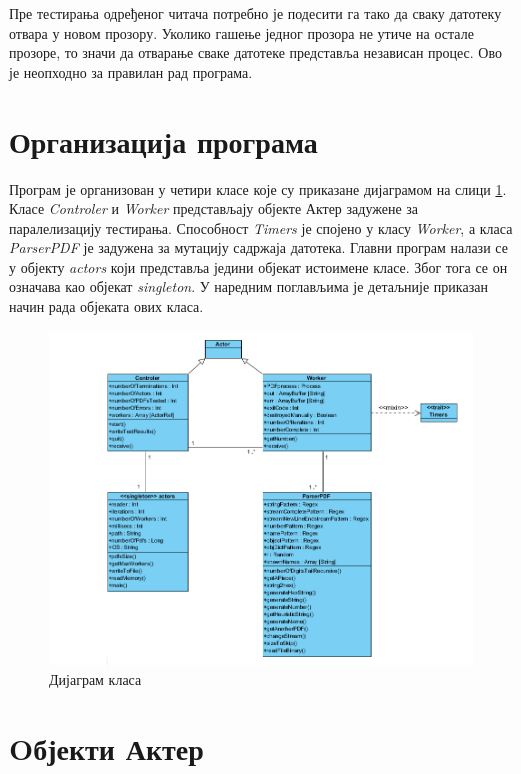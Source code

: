 \documentclass[12pt,oneside]{memoir}
\begin{document}
Пре тестирања одређеног читача потребно је подесити га тако да сваку датотеку отвара у новом прозору. Уколико гашење једног прозора не утиче на остале прозоре, то значи да отварање сваке датотеке представља независан процес. Ово је неопходно за правилан рад програма. 

\section{Организација програма}
\label{sec:orgProg}

Програм је организован у четири класе које су приказане дијаграмом на слици \ref{fig:classDiagram}. Класе \textit{Controler} и \textit{Worker} представљају објекте Актер задужене за паралелизацију тестирања. Способност \textit{Timers} је спојено у класу \textit{Worker}, а класа \textit{ParserPDF} је задужена за мутацију садржаја датотека. Главни програм налази се у објекту \textit{actors} који представља једини објекат истоимене класе. Због тога се он означава као објекат \textit{singleton}. У наредним поглављима је детаљније приказан начин рада објеката ових класа. 

\begin{figure}[!ht]
  \centering
  \includegraphics[width=1\textwidth]{classDiagram.png}
  \caption{Дијаграм класа}
  \label{fig:classDiagram}
\end{figure}

\section{Oбјекти Актер}
\label{sec:actorObj}
\end{document}
